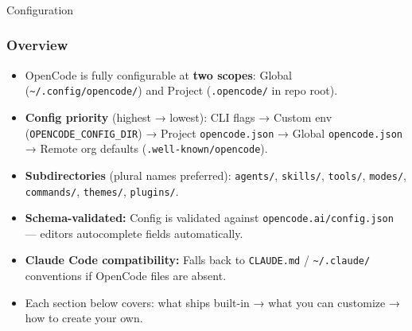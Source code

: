 \begin{frame}[fragile]\frametitle{}

\begin{center}
{\Large Configuration}
\end{center}
\end{frame}


\begin{frame}[fragile]\frametitle{Overview}
  \begin{itemize}
    \item OpenCode is fully configurable at \textbf{two scopes}: Global (\texttt{\textasciitilde/.config/opencode/}) and Project (\texttt{.opencode/} in repo root).
    \item \textbf{Config priority} (highest → lowest): CLI flags → Custom env (\texttt{OPENCODE\_CONFIG\_DIR}) → Project \texttt{opencode.json} → Global \texttt{opencode.json} → Remote org defaults (\texttt{.well-known/opencode}).
    \item \textbf{Subdirectories} (plural names preferred): \texttt{agents/}, \texttt{skills/}, \texttt{tools/}, \texttt{modes/}, \texttt{commands/}, \texttt{themes/}, \texttt{plugins/}.
    \item \textbf{Schema-validated:} Config is validated against \texttt{opencode.ai/config.json} — editors autocomplete fields automatically.
    \item \textbf{Claude Code compatibility:} Falls back to \texttt{CLAUDE.md} / \texttt{\textasciitilde/.claude/} conventions if OpenCode files are absent.
    \item Each section below covers: what ships built-in → what you can customize → how to create your own.
  \end{itemize}
\end{frame}


